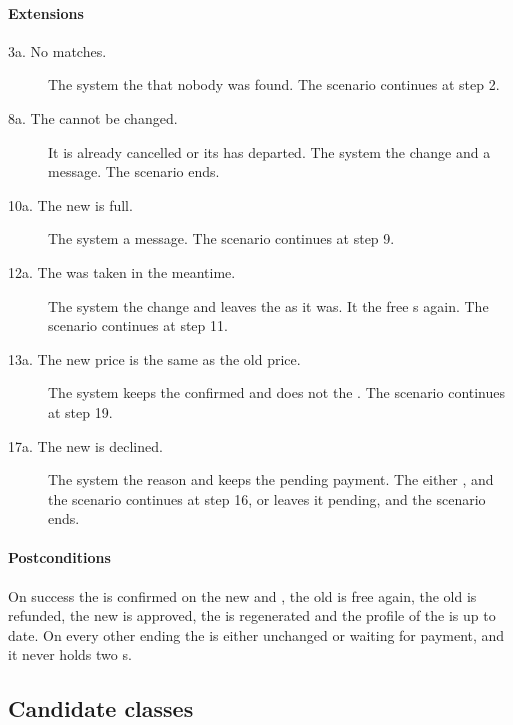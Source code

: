 \paragraph{Extensions}

\begin{description}
\item[3a. No  matches.] The system  the
   that nobody was found. The scenario continues at step 2.
\item[8a. The  cannot be changed.] It is already cancelled or
  its  has departed. The system  the change and
   a message. The scenario ends.
\item[10a. The new  is full.] The system  a message. The
  scenario continues at step 9.
\item[12a. The  was taken in the meantime.] The system 
  the change and leaves the  as it was. It  the
  free s again. The scenario continues at step 11.
\item[13a. The new price is the same as the old price.] The system keeps the
   confirmed and does not  the . The
  scenario continues at step 19.
\item[17a. The new  is declined.] The system  the reason
  and keeps the  pending payment. The 
  either , and the scenario continues at step 16, or leaves it
  pending, and the scenario ends.
\end{description}

\paragraph{Postconditions}

On success the  is confirmed on the new  and
, the old  is free again, the old  is refunded,
the new  is approved, the  is regenerated and the
profile of the  is up to date. On every other ending the
 is either unchanged or waiting for payment, and it never
holds two s.

\subsection*{Candidate classes}

